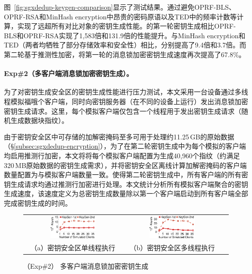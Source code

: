 图~\ref{fig:sgxdedup-keygen-comparison}显示了测试结果。\sysnameS 通过避免OPRF-BLS、OPRF-RSA和MinHash encryption中昂贵的密码原语以及TED中的频率计数等计算，实现了远超所有对比对象的密钥生成性能。\sysnameS 的第一轮密钥生成相比OPRF-BLS和OPRF-RSA实现了1,583倍和131.9倍的性能提升。与MinHash encryption和TED（两者均牺牲了部分存储效率和安全性）相比，分别提高了9.4倍和3.7倍。而第二轮基于推测性加密，\sysnameS 将第一轮的消息锁加密密钥生成速度再次提高了67.8\%。

\paragraph*{Exp\#2（多客户端消息锁加密密钥生成）。}为了对密钥生成安全区的密钥生成性能进行压力测试，本文采用一台设备通过多线程模拟福哦个客户端，同时向密钥服务器（在不同的设备上运行）发出消息锁加密密钥生成请求。这里，每个模拟客户端仅包含一个线程用于发出密钥生成请求（随机生成数据块指纹）。

由于密钥安全区中可存储的加解密掩码至多可用于处理约11.25\,GB的原始数据（\S\ref{subsec:sgxdedup-encryption}），为了在第二轮密钥生成中为每个模拟的客户端均启用推测行加密，本文将将每个模拟客户端配置为生成40,960个指纹（约满足320\,MB原始数据的密钥生成需求），并将密钥安全区离线计算加解密掩码的客户端数量配置为与模拟客户端数量一致。使得第二轮密钥生成中，所有客户端的所有密钥生成请求均通过推测行加密进行处理。本文统计分析所有模拟客户端聚合的密钥生成速度，该速度定义为总密钥生成数量除以第一个客户端启动到所有客户端全部完成密钥生成的时间。

\begin{figure}[!htb]
    \small
    \centering
    \begin{tabular}{@{}c@{}c@{}c}
        \includegraphics[width=0.49\textwidth]{pic/sgxdedup/expa3_keyScale_performance_number_singleThread.pdf} &
        \hspace{5pt}
        \includegraphics[width=0.49\textwidth]{pic/sgxdedup/expa3_keyScale_performance_number_multiThread.pdf}\\
        \mbox{\small （a）密钥安全区单线程执行} &
        \mbox{\small （b）密钥安全区多线程执行}\\
    \end{tabular}
    \caption{（Exp\#2） 多客户端消息锁加密密钥生成} 
    \label{fig:sgxdedup-exp-keygen-scalability}
\end{figure}

